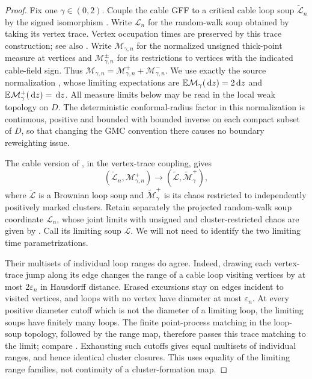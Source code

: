 \begin{proof}
Fix one \(\gamma\in(0,2)\).  Couple the cable GFF to a critical
cable loop soup \(\widetilde{\mathcal L}_n\) by the signed isomorphism
\cite{Lupu2016}.  Write \(\mathcal L_n\) for the random-walk soup
obtained by taking its vertex trace.  Vertex occupation times are
preserved by this trace construction; see also
\cite[Section~2.2]{ALS2018}.  Write
\(\mathcal M_{\gamma,n}\) for the normalized unsigned thick-point
measure at vertices and \(\mathcal M_{\gamma,n}^{\pm}\) for its
restrictions to vertices with the indicated cable-field sign.
Thus \(\mathcal M_{\gamma,n}
=\mathcal M_{\gamma,n}^{+}+\mathcal M_{\gamma,n}^{-}\).
We use exactly the source normalization
\cite[(2.5), (2.10), Theorem~2.1]{JLQ2023Fields}, whose limiting expectations are
\(\mathbb E\mathcal M_\gamma(\,\mathrm d z)=2\,\mathrm d z\) and
\(\mathbb E\mathcal M_\gamma^+(\,\mathrm d z)=\,\mathrm d z\).
All measure limits below may be read in the local weak topology on
\(D\).  The deterministic conformal-radius factor in this
normalization is continuous, positive and bounded with bounded inverse
on each compact subset of \(D\), so that changing the GMC convention
there causes no boundary reweighting issue.

The cable version of \cite[Corollary~8.4 and the paragraph following
it]{JLQ2023Fields}, in the vertex-trace coupling, gives
\begin{equation}
 (\widetilde{\mathcal L}_n,\mathcal M_{\gamma,n}^{+})
       \longrightarrow(\widetilde{\mathcal L},
                       \widetilde{\mathcal M}_\gamma^{+}),
 \label{eq:soup-positive-chaos}
\end{equation}
where \(\widetilde{\mathcal L}\) is a Brownian loop soup and
\(\widetilde{\mathcal M}_\gamma^{+}\) is its chaos restricted to
independently positively marked clusters.  Retain separately the
projected random-walk soup coordinate \(\mathcal L_n\), whose
joint limits with unsigned and cluster-restricted chaos are given by
\cite[Theorem~8.3]{JLQ2023Fields}.  Call its limiting soup
\(\mathcal L\).  We will not need to identify the two limiting
time parametrizations.

Their multisets of individual loop ranges do agree.  Indeed, drawing
each vertex-trace jump along its edge changes the range of a cable
loop visiting vertices by at most \(2\varepsilon_n\) in Hausdorff
distance.  Erased excursions stay on edges incident to visited
vertices, and loops with no vertex have diameter at most
\(\varepsilon_n\).  At every positive diameter cutoff which is
not the diameter of a limiting loop, the limiting soups have finitely
many loops.  The finite point-process matching in the loop-soup
topology, followed by the range map, therefore passes this trace
matching to the limit; compare \cite[Section~4.1.2]{ALS2018}.
Exhausting such cutoffs gives equal multisets of individual ranges,
and hence identical cluster closures.  This uses equality of the
limiting range families, not continuity of a cluster-formation map.


\end{proof}
